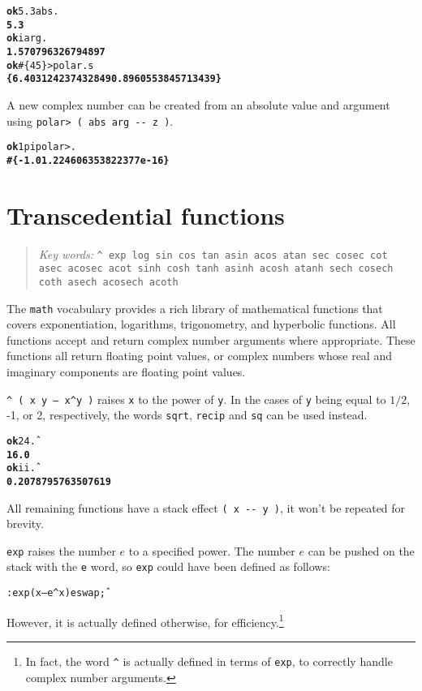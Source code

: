 \documentclass[english]{book}
\newcommand{\chapkeywords}[1]{%
\begin{quote}
\emph{Key words:} \texttt{#1}
\end{quote}
}
\begin{document}
\begin{alltt}
\textbf{ok} 5.3 abs .
\textbf{5.3}
\textbf{ok} i arg .
\textbf{1.570796326794897}
\textbf{ok} \#\{ 4 5 \} >polar .s
\textbf{\{ 6.403124237432849 0.8960553845713439 \}}
\end{alltt}

A new complex number can be created from an absolute value and argument using \texttt{polar> ( abs arg -{}- z )}.

\begin{alltt}
\textbf{ok} 1 pi polar> .
\textbf{\#\{ -1.0 1.224606353822377e-16 \}}
\end{alltt}

\section{Transcedential functions}

\chapkeywords{\^{} exp log sin cos tan asin acos atan sec cosec cot asec acosec acot sinh cosh tanh asinh acosh atanh sech cosech coth asech acosech acoth}

The \texttt{math} vocabulary provides a rich library of mathematical functions that covers exponentiation, logarithms, trigonometry, and hyperbolic functions. All functions accept and return complex number arguments where appropriate. These functions all return floating point values, or complex numbers whose real and imaginary components are floating point values.

\texttt{\^{} ( x y -- x\^{}y )} raises \texttt{x} to the power of \texttt{y}. In the cases of \texttt{y} being equal to $1/2$, -1, or 2, respectively, the words \texttt{sqrt}, \texttt{recip} and \texttt{sq} can be used instead.

\begin{alltt}
\textbf{ok} 2 4 \^ .
\textbf{16.0}
\textbf{ok} i i \^ .
\textbf{0.2078795763507619}
\end{alltt}

All remaining functions have a stack effect \texttt{( x -{}- y )}, it won't be repeated for brevity.

\texttt{exp} raises the number $e$ to a specified power. The number $e$ can be pushed on the stack with the \texttt{e} word, so \texttt{exp} could have been defined as follows:

\begin{alltt}
: exp ( x -- e^x ) e swap \^ ;
\end{alltt}

However, it is actually defined otherwise, for efficiency.\footnote{In fact, the word \texttt{\^{}} is actually defined in terms of \texttt{exp}, to correctly handle complex number arguments.}
\end{document}
